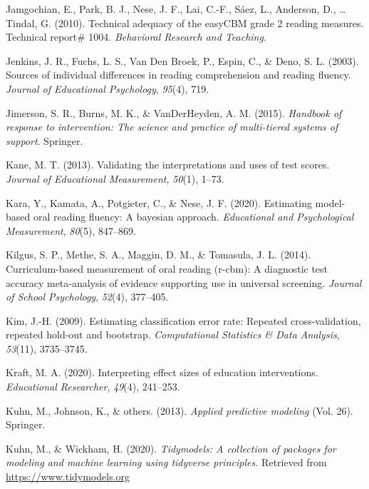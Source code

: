 \documentclass[
  english,
  man, fleqn, noextraspace]{apa6}
\begin{document}
\leavevmode\hypertarget{ref-jamgochian2010tech}{}%
Jamgochian, E., Park, B. J., Nese, J. F., Lai, C.-F., Sáez, L., Anderson, D., \ldots{} Tindal, G. (2010). Technical adequacy of the easyCBM grade 2 reading measures. Technical report\# 1004. \emph{Behavioral Research and Teaching}.

\leavevmode\hypertarget{ref-jenkins2003}{}%
Jenkins, J. R., Fuchs, L. S., Van Den Broek, P., Espin, C., \& Deno, S. L. (2003). Sources of individual differences in reading comprehension and reading fluency. \emph{Journal of Educational Psychology}, \emph{95}(4), 719.

\leavevmode\hypertarget{ref-jimerson2015}{}%
Jimerson, S. R., Burns, M. K., \& VanDerHeyden, A. M. (2015). \emph{Handbook of response to intervention: The science and practice of multi-tiered systems of support}. Springer.

\leavevmode\hypertarget{ref-kane2013}{}%
Kane, M. T. (2013). Validating the interpretations and uses of test scores. \emph{Journal of Educational Measurement}, \emph{50}(1), 1--73.

\leavevmode\hypertarget{ref-kara2020}{}%
Kara, Y., Kamata, A., Potgieter, C., \& Nese, J. F. (2020). Estimating model-based oral reading fluency: A bayesian approach. \emph{Educational and Psychological Measurement}, \emph{80}(5), 847--869.

\leavevmode\hypertarget{ref-kilgus2014}{}%
Kilgus, S. P., Methe, S. A., Maggin, D. M., \& Tomasula, J. L. (2014). Curriculum-based measurement of oral reading (r-cbm): A diagnostic test accuracy meta-analysis of evidence supporting use in universal screening. \emph{Journal of School Psychology}, \emph{52}(4), 377--405.

\leavevmode\hypertarget{ref-kim2009}{}%
Kim, J.-H. (2009). Estimating classification error rate: Repeated cross-validation, repeated hold-out and bootstrap. \emph{Computational Statistics \& Data Analysis}, \emph{53}(11), 3735--3745.

\leavevmode\hypertarget{ref-kraft2020}{}%
Kraft, M. A. (2020). Interpreting effect sizes of education interventions. \emph{Educational Researcher}, \emph{49}(4), 241--253.

\leavevmode\hypertarget{ref-kuhn2013}{}%
Kuhn, M., Johnson, K., \& others. (2013). \emph{Applied predictive modeling} (Vol. 26). Springer.

\leavevmode\hypertarget{ref-R-tidymodels}{}%
Kuhn, M., \& Wickham, H. (2020). \emph{Tidymodels: A collection of packages for modeling and machine learning using tidyverse principles.} Retrieved from \url{https://www.tidymodels.org}
\end{document}
